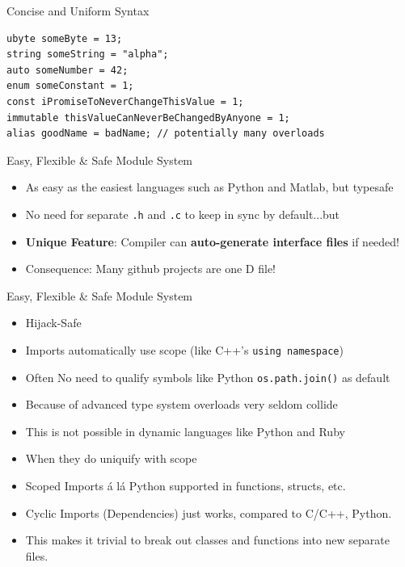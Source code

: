 \documentclass[xcolor=dvipsnames]{beamer}
\begin{document}
\begin{frame}[fragile]{Concise and Uniform Syntax}
\begin{lstlisting}[frame=single]
ubyte someByte = 13;
string someString = "alpha";
auto someNumber = 42;
enum someConstant = 1;
const iPromiseToNeverChangeThisValue = 1;
immutable thisValueCanNeverBeChangedByAnyone = 1;
alias goodName = badName; // potentially many overloads
\end{lstlisting}
\end{frame}

\begin{frame}[fragile]{Easy, Flexible \& Safe Module System}
  \begin{itemize}[<+->]
  \item As easy as the easiest languages such as Python and Matlab, but typesafe
  \item No need for separate \texttt{.h} and \texttt{.c} to keep in sync by
    default...but
  \item \textbf{Unique Feature}: Compiler can \textbf{auto-generate interface
      files} if needed!
  \item Consequence: Many github projects are one D file!
  \end{itemize}
\end{frame}

\begin{frame}[fragile]{Easy, Flexible \& Safe Module System}
  \begin{itemize}[<+->]
  \item Hijack-Safe
  \item Imports automatically use scope (like C++’s \texttt{using namespace})
  \item Often No need to qualify symbols like Python \texttt{os.path.join()} as
    default
  \item Because of advanced type system overloads very seldom collide
  \item This is not possible in dynamic languages like Python and Ruby
  \item When they do uniquify with scope
  \item Scoped Imports á lá Python supported in functions, structs, etc.
  \item Cyclic Imports (Dependencies) just works, compared to C/C++,
    Python.
  \item This makes it trivial to break out classes and functions into new
    separate files.
  \end{itemize}
\end{frame}
\end{document}

